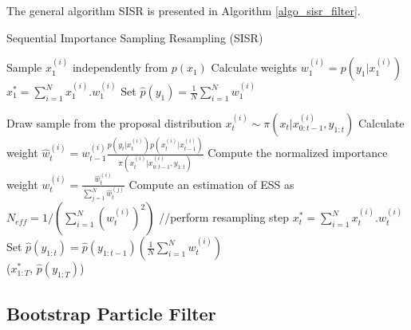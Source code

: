\documentclass[11pt,a4,twosided,singlespacing,titlepagenumber=on]{scrreprt}
\numberwithin{equation}{chapter} %
\theoremstyle{remark}
\begin{document}
The general algorithm SISR is presented in Algorithm \ref{algo_sisr_filter}.
\begin{algorithm}[H]
\caption{Sequential Importance Sampling Resampling (SISR)}\label{algo_sisr_filter}
\begin{algorithmic}[1]
	\State Sample $x_1^{(i)}$ independently from $p(x_1)$
	\State Calculate weights $w_1^{(i)} = p(y_1 | x_1^{(i)})$
\State $x^*_1 = \sum_{i=1}^N x_1^{(i)}.w_1^{(i)}$
\State Set $\hat{p}(y_1) = \frac{1}{N} \sum_{i=1}^N w_1^{(i)}$

	  \State Draw sample from the proposal distribution $x_t^{(i)} \sim \pi \left(x_t|x_{0:t-1}^{(i)}, y_{1:t} \right)$
		\State Calculate weight $\displaystyle{\hat{w}_t^{(i)} = w_{t-1}^{(i)} \frac{p(y_t|x_t^{(i)}) p(x_t^{(i)}|x_{t-1}^{(i)})}{\pi \left(x_t^{(i)}|x_{0:t-1}^{(i)}, y_{1:t} \right)}}$
		\State Compute the normalized importance weight $\displaystyle{w_t^{(i)} = \frac{\hat{w}_t^{(i)}}{\sum_{j=1}^N \hat{w}_t^{(j)}}}$
	\State Compute an estimation of ESS as $N_{eff} = 1 / \left(  \sum_{i=1}^N \left(w_t^{(i)} \right)^2 \right)$
		  \State //perform resampling step
	\State $x^*_t = \sum_{i=1}^N x_t^{(i)}.w_t^{(i)}$
	\State Set $\hat{p}(y_{1:t}) = \hat{p}(y_{1:t-1}) \left(\frac{1}{N} \sum_{i=1}^N w_t^{(i)} \right)$
\\
\Return ($x^*_{1:T}$, $\hat{p}(y_{1:T})$)
\EndProcedure
\end{algorithmic}
\end{algorithm}

\subsection{Bootstrap Particle Filter}

% 
\end{document}
